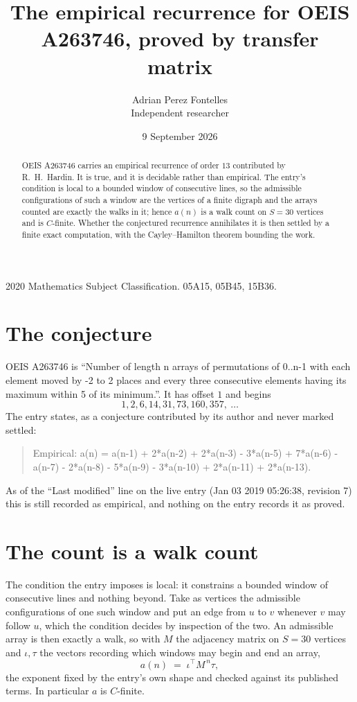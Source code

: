 \documentclass[11pt,a4paper]{article}
\title{The empirical recurrence for OEIS A263746, proved by transfer matrix}
\author{Adrian Perez Fontelles\\ \small Independent researcher}
\date{9 September 2026}
\theoremstyle{plain}
\theoremstyle{definition}
\begin{document}
\maketitle

\begin{abstract}
OEIS A263746 carries an empirical recurrence of order $13$ contributed by R.~H.~Hardin. It is
true, and it is decidable rather than empirical. The entry's condition is local to a bounded window of consecutive lines, so
the admissible configurations of such a window are the vertices of a finite digraph and the
arrays counted are exactly the walks in it; hence $a(n)$ is a walk count on $S=30$ vertices
and is $C$-finite. Whether the conjectured recurrence annihilates it is then settled by a
finite exact computation, with the Cayley--Hamilton theorem bounding the work.
\end{abstract}

\noindent\small 2020 Mathematics Subject Classification. 05A15, 05B45, 15B36.\normalsize

\section{The conjecture}

OEIS A263746 is ``Number of length n arrays of permutations of 0..n-1 with each element moved by -2 to 2 places and every three consecutive elements having its maximum within 5 of its minimum.''. It has offset $1$ and begins
\[
1, 2, 6, 14, 31, 73, 160, 357,\ \dots
\]
The entry states, as a conjecture contributed by its author and never marked settled:
\begin{quote}
Empirical: a(n) = a(n-1) + 2*a(n-2) + 2*a(n-3) - 3*a(n-5) + 7*a(n-6) - a(n-7) - 2*a(n-8) - 5*a(n-9) - 3*a(n-10) + 2*a(n-11) + 2*a(n-13).
\end{quote}
As of the ``Last modified'' line on the live entry (Jan 03 2019 05:26:38, revision 7) this is still
recorded as empirical, and nothing on the entry records it as proved.

\section{The count is a walk count}

The condition the entry imposes is local: it constrains a bounded window of consecutive lines and nothing beyond. Take as
vertices the admissible configurations of one such window and put an edge from $u$ to $v$
whenever $v$ may follow $u$, which the condition decides by inspection of the two. An
admissible array is then exactly a walk, so with $M$ the adjacency matrix on $S=30$ vertices
and $\iota,\tau$ the vectors recording which windows may begin and end an array,
\[
a(n)\;=\;\iota^{\!\top}M^{\,n}\tau ,
\]
the exponent fixed by the entry's own shape and checked against its published terms. In
particular $a$ is $C$-finite.
\end{document}
